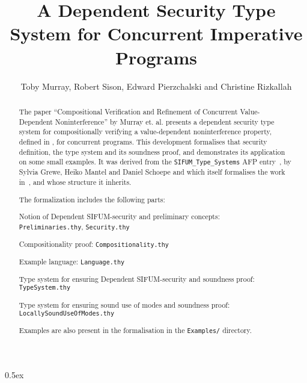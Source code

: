 \documentclass[11pt,a4paper]{article}
\title{A Dependent Security Type System for Concurrent Imperative Programs}
\author{Toby Murray, Robert Sison, Edward Pierzchalski and Christine Rizkallah}
\begin{document}
\maketitle
\parindent 0pt\parskip 0.5ex

\begin{abstract}
  The paper ``Compositional Verification and Refinement of Concurrent Value-Dependent 
  Noninterference'' by Murray et. al. \cite{Murray_SPR_16}
  presents a dependent security type system for compositionally verifying a value-dependent
  noninterference property, defined in \cite{Murray_15}, for concurrent programs. This development 
  formalises that security definition, the type system
  and its soundness proof, and demonstrates its application on some small examples. 
  It was derived from the \texttt{SIFUM\_Type\_Systems} AFP entry~\cite{Grewe_MS_14}, by Sylvia Grewe, Heiko Mantel and Daniel Schoepe and
  which itself formalises the work in~\cite{Mantel_SS_11}, and whose structure it
  inherits.

The formalization includes the following parts:

\begin{compactitem}
\item Notion of Dependent SIFUM-security and preliminary concepts:\\
  \texttt{Preliminaries.thy}, \texttt{Security.thy}
\item Compositionality proof: \texttt{Compositionality.thy}
\item Example language: \texttt{Language.thy}
\item Type system for ensuring Dependent SIFUM-security and soundness proof: \\
  \texttt{TypeSystem.thy}
\item Type system for ensuring sound use of modes and soundness proof:
  \texttt{LocallySoundUseOfModes.thy}
\end{compactitem}

Examples are also present in the formalisation in the \texttt{Examples/} directory.

\end{abstract}

\tableofcontents















\end{document}
